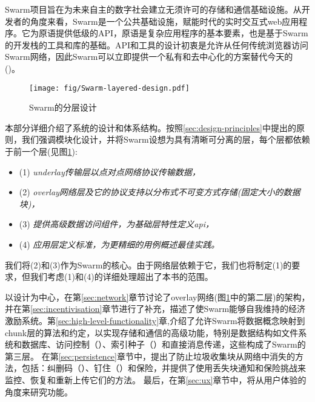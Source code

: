 
\green{}

Swarm项目旨在为未来自主的数字社会建立无须许可的存储和通信基础设施。从开发者的角度来看，Swarm是一个公共基础设施，赋能时代的实时交互式web应用程序。它为原语提供低级的API，原语是复杂应用程序的基本要素，也是基于Swarm的开发栈的工具和库的基础。API和工具的设计初衷是允许从任何传统浏览器访问Swarm网络，因此Swarm可以立即提供一个私有和去中心化的方案替代今天的 ()。

\begin{figure}[htbp]
  \centering
    \texttt{[image: fig/Swarm-layered-design.pdf]}
  \caption[Swarm的分层设计\statusgreen]{Swarm的分层设计}
\label{fig:Swarm-layered-design}
\end{figure}

本部分详细介绍了系统的设计和体系结构。按照\ref{sec:design-principles}中提出的原则，我们强调模块化设计，并将Swarm设想为具有清晰可分离的层，每个层都依赖于前一个层(见图\ref{fig:Swarm-layered-design}):

\begin{itemize}
\item (1) \emph{underlay传输层以点对点网络协议传输数据，}
\item (2) \emph{overlay网络层及它的协议支持以分布式不可变方式存储(固定大小的数据块)，}
\item (3) \emph{提供高级数据访问组件，为基础层特性定义api，}
\item (4) \emph{应用层定义标准，为更精细的用例概述最佳实践。}
\end{itemize}

我们将(2)和(3)作为Swarm的核心。由于网络层依赖于它，我们也将制定(1)的要求，但我们考虑(1)和(4)的详细处理超出了本书的范围。


以设计为中心，在第\ref{sec:network}章节讨论了overlay网络(图\ref{fig:Swarm-layered-design}中的第二层)的架构，并在第\ref{sec:incentivisation}章节进行了补充，描述了使Swarm能够自我维持的经济激励系统。第\ref{sec:high-level-functionality}章,介绍了允许Swarm将数据概念映射到chunk层的算法和约定，以实现存储和通信的高级功能，特别是数据结构如文件系统和数据库、访问控制（）、索引种子（）和直接消息传递，这些构成了Swarm的第三层。
在第\ref{sec:persistence}章节中，提出了防止垃圾收集块从网络中消失的方法，包括：纠删码（）、钉住（）和保险，并提供了使用丢失块通知和保险挑战来监控、恢复和重新上传它们的方法。
最后，在第\ref{sec:ux}章节中，将从用户体验的角度来研究功能。

